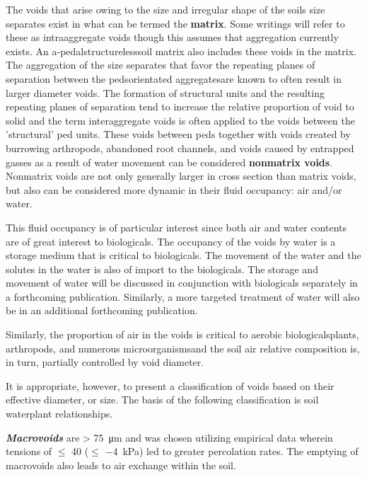 \documentclass{article}
\begin{document}
The voids that arise owing to the size and irregular shape of the soils size separates exist in what can be termed the \textbf{matrix}. Some writings will refer to these as intraaggregate voids though this assumes that aggregation currently exists. An a-pedal\textemdash{}structureless\textemdash{}soil matrix also includes these voids in the matrix. The aggregation of the size separates that favor the repeating planes of separation between the peds\textemdash{}orientated aggregates\textemdash{}are known to often result in larger diameter voids. The formation of structural units and the resulting repeating planes of separation tend to increase the relative proportion of void to solid and the term interaggregate voids is often applied to the voids between the 'structural' ped units. These voids between peds together with voids created by burrowing arthropods, abandoned root channels, and voids caused by entrapped gasses as a result of water movement can be considered \textbf{nonmatrix voids}. Nonmatrix voids are not only generally larger in cross section than matrix voids, but also can be considered more dynamic in their fluid occupancy: air and/or water.  


This fluid occupancy is of particular interest since both air and water contents are of great interest to biologicals. The occupancy of the voids by water is a storage medium that is critical to biologicals. The movement of the water and the solutes in the water is also of import to the biologicals. The storage and movement of water will be discussed in conjunction with biologicals separately in a forthcoming publication. Similarly, a more targeted treatment of water will also be in an additional forthcoming publication.  

Similarly, the proportion of air in the voids is critical to aerobic biologicals\textemdash{}plants, arthropods, and numerous microorganisms\textemdash{}and the soil air relative composition is, in turn, partially controlled by void diameter.

It is appropriate, however, to present a classification of voids based on their effective diameter, or size. The basis of the following classification is soil water\textemdash{}plant relationships.  

\textbf{\textit{Macrovoids}} are \textgreater{} \qty{75}{\micro\metre} and was chosen utilizing empirical data wherein tensions of $\leq$ \qty{40}{} ($\leq$ \qty{-4}{kPa}) led to greater percolation rates. The emptying of macrovoids also leads to air exchange within the soil.  
\end{document}
